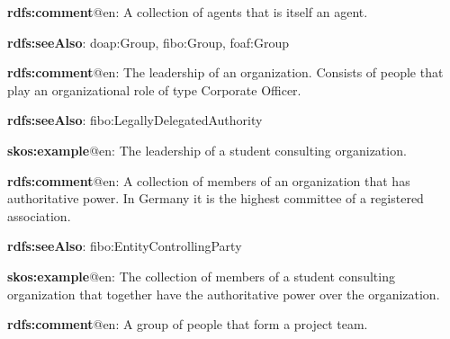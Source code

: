 \documentclass[a4paper, DIV=13, BCOR=0cm]{scrbook}
\begin{document}
\begin{mdframed}[style=onto-1, frametitle={Group}]
	{%
		\begin{compactitem}
			\item \textbf{rdfs:comment}@en: A collection of agents that is itself an agent.
			\item \textbf{rdfs:seeAlso}: doap:Group, fibo:Group, foaf:Group
		\end{compactitem}
	} %
\end{mdframed}

\begin{mdframed}[style=onto-2, frametitle={Executive Board}]
	{%
		\begin{compactitem}
			\item \textbf{rdfs:comment}@en: The leadership of an organization. Consists of people that play an organizational role of type Corporate Officer.
			\item \textbf{rdfs:seeAlso}: fibo:LegallyDelegatedAuthority
			\item \textbf{skos:example}@en: The leadership of a student consulting organization.
		\end{compactitem}
	} %
\end{mdframed}

\begin{mdframed}[style=onto-2, frametitle={Member Assembly}]
	{%
		\begin{compactitem}
			\item \textbf{rdfs:comment}@en: A collection of members of an organization that has authoritative power. In Germany it is the highest committee of a registered association.
			\item \textbf{rdfs:seeAlso}: fibo:EntityControllingParty
			\item \textbf{skos:example}@en: The collection of members of a student consulting organization that together have the authoritative power over the organization.
		\end{compactitem}
	} %
\end{mdframed}

\begin{mdframed}[style=onto-2, frametitle={Project Team}]
	{%
		\begin{compactitem}
			\item \textbf{rdfs:comment}@en: A group of people that form a project team.
		\end{compactitem}
	} %
\end{mdframed}
\end{document}
